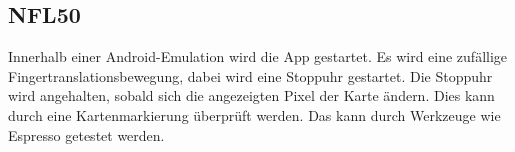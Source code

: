 \subsection*{NFL50}

Innerhalb einer \Gls{Android}-\Gls{Emulation} wird die App gestartet.
Es wird eine zufällige \Gls{Fingertranslationsbewegung}, dabei wird eine Stoppuhr gestartet.
Die Stoppuhr wird angehalten, sobald sich die angezeigten Pixel der Karte ändern.
Dies kann durch eine Kartenmarkierung überprüft werden.
Das kann durch Werkzeuge wie \Gls{Espresso} getestet werden.